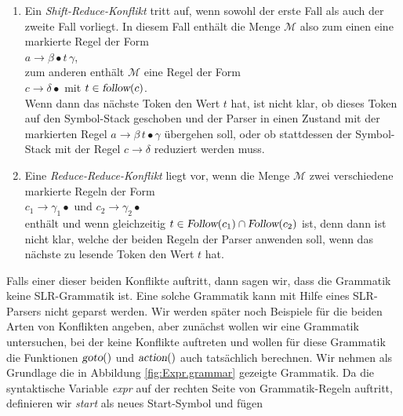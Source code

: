 \begin{enumerate}
\item Ein \textsl{Shift-Reduce-Konflikt} tritt auf, wenn sowohl der erste Fall als auch der zweite Fall
      vorliegt.   In diesem Fall enth\"alt die Menge $\mathcal{M}$ also zum einen eine markierte Regel
      der Form
      \\[0.2cm]
      \hspace*{1.3cm}
      $a \rightarrow \beta \bullet t\, \gamma$,
      \\[0.2cm]
      zum anderen enth\"alt $\mathcal{M}$ eine Regel der Form
      \\[0.2cm]
      \hspace*{1.3cm}
      $c \rightarrow \delta \bullet$ \quad mit $t \in \textsl{follow}(c)$.
      \\[0.2cm]
      Wenn dann das n\"achste Token den Wert $t$ hat, ist nicht klar, ob dieses Token auf den Symbol-Stack 
      geschoben und der Parser in einen Zustand mit der markierten Regel 
      $a \rightarrow \beta\, t \bullet \gamma$ \"ubergehen soll, oder ob stattdessen der Symbol-Stack mit 
      der Regel $c \rightarrow \delta$ reduziert werden muss.
\item Eine \textsl{Reduce-Reduce-Konflikt} liegt vor, wenn die Menge $\mathcal{M}$ zwei verschiedene
      markierte Regeln der Form
      \\[0.2cm]
      \hspace*{1.3cm}
      $c_1 \rightarrow \gamma_1 \bullet$ \quad  und \quad $c_2 \rightarrow \gamma_2 \bullet$
      \\[0.2cm]
      enth\"alt und wenn gleichzeitig $t \in \textsl{Follow}(c_1) \cap \textsl{Follow}(c_2)$ ist,
      denn dann ist nicht klar, welche
      der beiden Regeln der Parser anwenden soll, wenn das n\"achste zu lesende Token den Wert $t$ hat.
\end{enumerate}
Falls einer dieser beiden Konflikte auftritt, dann sagen wir, dass die Grammatik keine
SLR-Grammatik ist.  Eine solche Grammatik kann mit Hilfe eines SLR-Parsers nicht geparst
werden.  Wir werden sp\"ater noch Beispiele f\"ur die beiden Arten von Konflikten angeben, aber
zun\"achst wollen wir eine Grammatik untersuchen, bei der keine Konflikte auftreten und wollen f\"ur
diese Grammatik die Funktionen $\textsl{goto}()$ und $\textsl{action}()$ auch tats\"achlich
berechnen.  Wir nehmen als Grundlage die  in Abbildung
\ref{fig:Expr.grammar} gezeigte Grammatik.
Da die syntaktische Variable \textsl{expr} auf der rechten Seite von
Grammatik-Regeln auftritt, definieren wir \textsl{start} als neues Start-Symbol und f\"ugen
